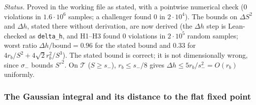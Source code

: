 \noindent\emph{Status.} Proved in the working file as stated, with a pointwise numerical check
($0$ violations in $1.6\cdot10^6$ samples; a challenger found $0$ in $2\cdot10^4$). The bounds on
$\Delta S^2$ and $\Delta h$, stated there without derivation, are now derived (the $\Delta h$ step is Lean-checked as
\texttt{delta\_h}, and  H1--H3 found $0$ violations in $2\cdot10^5$ random samples; worst ratio
$\Delta h/\text{bound}=0.96$ for the stated bound and $0.33$ for $4r_b/S^2+4\sqrt2r_b^2/S^3$). The stated bound is correct;
it is not dimensionally wrong, since $\sigma_-$ bounds $S'^2$. On $\mathcal T$ ($S\ge s_-$), $r_b\le s_-/8$ gives
$\Delta h\le5r_b/s_-^2=O(r_b)$ uniformly.

\subsubsection*{The Gaussian integral and its distance to the flat fixed point}


